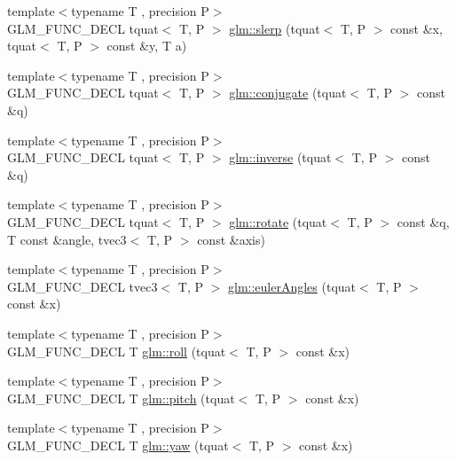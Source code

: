 \begin{DoxyCompactItemize}
\item 
{\footnotesize template$<$typename T , precision P$>$ }\\G\+L\+M\+\_\+\+F\+U\+N\+C\+\_\+\+D\+E\+C\+L tquat$<$ T, P $>$ \hyperlink{group__gtc__quaternion_ga22b438c7252f3fa5b773c9882471652a}{glm\+::slerp} (tquat$<$ T, P $>$ const \&x, tquat$<$ T, P $>$ const \&y, T a)
\item 
{\footnotesize template$<$typename T , precision P$>$ }\\G\+L\+M\+\_\+\+F\+U\+N\+C\+\_\+\+D\+E\+C\+L tquat$<$ T, P $>$ \hyperlink{group__gtc__quaternion_gab1ace864fbf189ffa368950001808a3c}{glm\+::conjugate} (tquat$<$ T, P $>$ const \&q)
\item 
{\footnotesize template$<$typename T , precision P$>$ }\\G\+L\+M\+\_\+\+F\+U\+N\+C\+\_\+\+D\+E\+C\+L tquat$<$ T, P $>$ \hyperlink{group__gtc__quaternion_ga5f47300c024c2d809944e6ac661d6d14}{glm\+::inverse} (tquat$<$ T, P $>$ const \&q)
\item 
{\footnotesize template$<$typename T , precision P$>$ }\\G\+L\+M\+\_\+\+F\+U\+N\+C\+\_\+\+D\+E\+C\+L tquat$<$ T, P $>$ \hyperlink{group__gtc__quaternion_gaa8f42979c921e450ff2812fb43c25702}{glm\+::rotate} (tquat$<$ T, P $>$ const \&q, T const \&angle, tvec3$<$ T, P $>$ const \&axis)
\item 
{\footnotesize template$<$typename T , precision P$>$ }\\G\+L\+M\+\_\+\+F\+U\+N\+C\+\_\+\+D\+E\+C\+L tvec3$<$ T, P $>$ \hyperlink{group__gtc__quaternion_gadb92ec1c1b0dd6b024176a73fbef3e64}{glm\+::euler\+Angles} (tquat$<$ T, P $>$ const \&x)
\item 
{\footnotesize template$<$typename T , precision P$>$ }\\G\+L\+M\+\_\+\+F\+U\+N\+C\+\_\+\+D\+E\+C\+L T \hyperlink{group__gtc__quaternion_ga4fd705376c6c1fd667be0055a0ea58ec}{glm\+::roll} (tquat$<$ T, P $>$ const \&x)
\item 
{\footnotesize template$<$typename T , precision P$>$ }\\G\+L\+M\+\_\+\+F\+U\+N\+C\+\_\+\+D\+E\+C\+L T \hyperlink{group__gtc__quaternion_ga2c08b93a4261c10748fd4d2104346f17}{glm\+::pitch} (tquat$<$ T, P $>$ const \&x)
\item 
{\footnotesize template$<$typename T , precision P$>$ }\\G\+L\+M\+\_\+\+F\+U\+N\+C\+\_\+\+D\+E\+C\+L T \hyperlink{group__gtc__quaternion_ga724a5df282b70cec0a6cb0d6dcddb6d6}{glm\+::yaw} (tquat$<$ T, P $>$ const \&x)

\end{DoxyCompactItemize}
